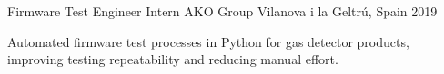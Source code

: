 \cventry
  {Firmware Test Engineer Intern}
  {AKO Group}
  {Vilanova i la Geltr\'u, Spain}
  {2019}
  {
    \begin{cvitems}
      \item {Automated firmware test processes in Python for gas detector products, improving testing repeatability and reducing manual effort.}
    \end{cvitems}
  }
